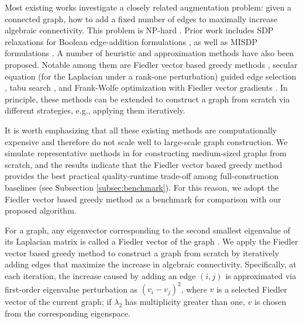 \documentclass[letterpaper, 10 pt, conference]{ieeeconf}  %
\newcommand{\1}{\mathbf{1}}
\newcommand{\0}{\mathbf{0}}
\begin{document}
Most existing works investigate a closely related augmentation problem: given a connected graph, how to add a fixed number of edges to maximally increase algebraic connectivity. This problem is NP-hard \cite{MOSKAOYAMA2008677}. Prior work includes SDP relaxations for Boolean edge-addition formulations \cite{ghosh2006growing}, as well as MISDP formulations \cite{somisetty2024spectral}. A number of heuristic and approximation methods have also been proposed. Notable among them are Fiedler vector based greedy methods \cite{ghosh2006growing,yin2024accelerating}, secular equation (for the Laplacian under a rank-one perturbation) guided edge selection \cite{kim2010bisection}, tabu search \cite{wei2014algebraic}, and Frank-Wolfe optimization with Fiedler vector gradients \cite{9981584}. In principle, these methods can be extended to construct a graph from scratch via different strategies, e.g., applying them iteratively.





It is worth emphasizing that all these existing methods are computationally expensive and therefore do not scale well to large-scale graph construction. 
We simulate representative methods in \cite{ghosh2006growing,8412478,wei2014algebraic,somisetty2024spectral,9981584,somisetty2025optimal} for constructing medium-sized graphs from scratch, and the results indicate that the Fiedler vector based greedy method \cite{ghosh2006growing} provides the best practical quality-runtime trade-off among full-construction baselines (see Subsection \ref{subsec:benchmark}).
For this reason, we adopt the Fiedler vector based greedy method as a benchmark for comparison with our proposed algorithm.


For a graph, any eigenvector corresponding to the second smallest eigenvalue of its Laplacian matrix is called a Fiedler vector of the graph \cite{Fiedler73}. We apply the Fiedler vector based greedy method to construct a graph from scratch by iteratively adding edges that maximize the increase in algebraic connectivity. Specifically, at each iteration, the increase caused by adding an edge $(i,j)$ is approximated via first-order eigenvalue perturbation as $(v_i - v_j)^2$, where $v$ is a selected Fiedler vector of the current graph; if $\lambda_2$ has multiplicity greater than one, $v$ is chosen from the corresponding eigenspace.
\end{document}
